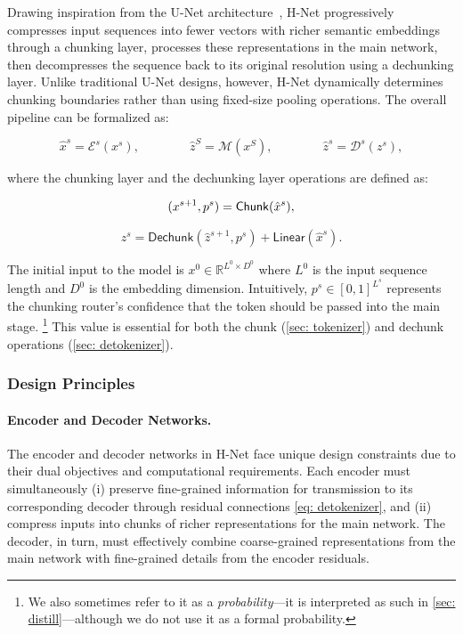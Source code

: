 \documentclass{article}
\newcommand{\citep}{\parencite}
\newcommand{\model}{H-Net}
\newcommand{\chunk}{chunking layer}
\newcommand{\dechunk}{dechunking layer}
\newcommand{\main}{main network}
\theoremstyle{plain}
\theoremstyle{remark}
\begin{document}
Drawing inspiration from the U-Net architecture~\citep{U-Net}, \model{} progressively compresses input sequences into fewer vectors with richer semantic embeddings through a \chunk{}, processes these representations in the \main{}, then decompresses the sequence back to its original resolution using a \dechunk{}.
Unlike traditional U-Net designs, however, \model{} dynamically determines chunking boundaries rather than using fixed-size pooling operations.
The overall pipeline can be formalized as:

\begin{equation}
    \label{eq: stages}
    \hat{x}^{s} = \mathcal{E}^{s}(x^{s}), \qquad\qquad \hat{z}^S = \mathcal{M}(x^S), \qquad\qquad \hat{z}^{s} = \mathcal{D}^{s}(z^{s}),
\end{equation}

where the \chunk{} and the \dechunk{} operations are defined as:

\begin{minipage}[t]{.45\linewidth}
  \begin{equation}
    \label{eq: tokenizer}
    (x^{s+1},\space p^{s}) = \mathsf{Chunk}(\hat{x}^s),
  \end{equation}
\end{minipage}
\begin{minipage}[t]{.55\linewidth}
  \begin{equation}
    \label{eq: detokenizer}
    z^{s} = \mathsf{Dechunk}(\hat{z}^{s+1}, p^{s}) + \mathsf{Linear}(\hat{x}^{s}).
  \end{equation}
\end{minipage}

The initial input to the model is $x^0 \in \mathbb{R}^{L^0 \times D^0}$ where $L^0$ is the input sequence length and $D^0$ is the embedding dimension.
Intuitively, $p^{s} \in [0,1]^{L^s}$ represents the chunking router's confidence that the token should be passed into the main stage.
\footnote{We also sometimes refer to it as a \emph{probability}---it is interpreted as such in \cref{sec: distill}---although we do not use it as a formal probability.}
This value is essential for both the chunk (\cref{sec: tokenizer}) and dechunk operations (\cref{sec: detokenizer}).

\subsubsection{Design Principles}

\paragraph{Encoder and Decoder Networks.}
The encoder and decoder networks in \model{} face unique design constraints due to their dual objectives and computational requirements.
Each encoder must simultaneously (i) preserve fine-grained information for transmission to its corresponding decoder through residual connections \eqref{eq: detokenizer}, and (ii) compress inputs into chunks of richer representations for the \main{}.
The decoder, in turn, must effectively combine coarse-grained representations from the \main{} with fine-grained details from the encoder residuals.
\end{document}
